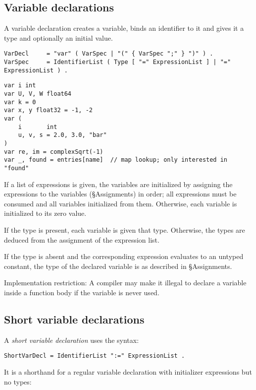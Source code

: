 \subsection*{Variable declarations}

A variable declaration creates a variable, binds an identifier to it and
gives it a type and optionally an initial value.

\begin{Verbatim}[frame=single]
VarDecl     = "var" ( VarSpec | "(" { VarSpec ";" } ")" ) .
VarSpec     = IdentifierList ( Type [ "=" ExpressionList ] | "=" ExpressionList ) .
\end{Verbatim}

\begin{Verbatim}[frame=single]
var i int
var U, V, W float64
var k = 0
var x, y float32 = -1, -2
var (
    i       int
    u, v, s = 2.0, 3.0, "bar"
)
var re, im = complexSqrt(-1)
var _, found = entries[name]  // map lookup; only interested in "found"
\end{Verbatim}

If a list of expressions is given, the variables are initialized by
assigning the expressions to the variables
(§Assignments) in order; all expressions must be
consumed and all variables initialized from them. Otherwise, each
variable is initialized to its zero value.

If the type is present, each variable is given that type. Otherwise, the
types are deduced from the assignment of the expression list.

If the type is absent and the corresponding expression evaluates to an
untyped constant, the type of the declared
variable is as described in §Assignments.

Implementation restriction: A compiler may make it illegal to declare a
variable inside a function body if
the variable is never used.

\subsection*{Short variable declarations}

A \emph{short variable declaration} uses the syntax:

\begin{Verbatim}[frame=single]
ShortVarDecl = IdentifierList ":=" ExpressionList .
\end{Verbatim}

It is a shorthand for a regular
variable declaration with initializer
expressions but no types:

